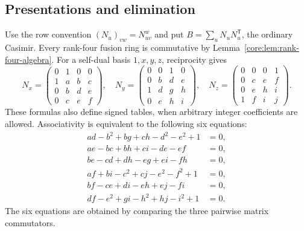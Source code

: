 \documentclass[11pt,a4paper]{article}
\theoremstyle{definition}\newtheorem{definition}[theorem]{Definition}
\theoremstyle{remark}\newtheorem{remark}[theorem]{Remark}
\numberwithin{equation}{section}
\begin{document}
\subsection{Presentations and elimination}\label{finite:sec:census}
Use the row convention $(N_u)_{vw}=N_{uv}^w$ and put
$B=\sum_u N_uN_u^{\mathsf T}$, the ordinary Casimir.
Every rank-four fusion ring is commutative by
Lemma~\ref{core:lem:rank-four-algebra}. For a self-dual basis $1,x,y,z$, reciprocity gives
\[
N_x=\begin{pmatrix}0&1&0&0\\1&a&b&c\\0&b&d&e\\0&c&e&f\end{pmatrix},\quad
N_y=\begin{pmatrix}0&0&1&0\\0&b&d&e\\1&d&g&h\\0&e&h&i\end{pmatrix},\quad
N_z=\begin{pmatrix}0&0&0&1\\0&c&e&f\\0&e&h&i\\1&f&i&j\end{pmatrix}.
\]
These formulas also define signed tables, when arbitrary integer coefficients are allowed.
Associativity is equivalent to the following six equations:
\begin{align}
 ad-b^2+bg+ch-d^2-e^2+1&=0,\label{finite:eq:census1}\\
 ae-bc+bh+ci-de-ef&=0,\label{finite:eq:census2}\\
 be-cd+dh-eg+ei-fh&=0,\label{finite:eq:census3}\\
 af+bi-c^2+cj-e^2-f^2+1&=0,\label{finite:eq:census4}\\
 bf-ce+di-eh+ej-fi&=0,\label{finite:eq:census5}\\
 df-e^2+gi-h^2+hj-i^2+1&=0.\label{finite:eq:census6}
\end{align}
The six equations are obtained by comparing the three pairwise matrix commutators.
\end{document}
